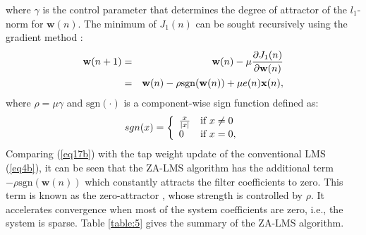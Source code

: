 \noindent where $\gamma$ is the control parameter that determines the degree of attractor of the $l_1$-norm for $\textbf{w}(n)$. The minimum of $J_{1}(n)$ can be sought recursively using the gradient method \cite{Haykins}:
\vspace{-0.6cm}
\begin{eqnarray}
\nonumber
\textbf{w}(n+1)&=&\textbf{w}(n)-\mu\frac{\partial J_1(n)}{\partial\textbf{w}(n)}\\
&=&\textbf{w}(n)-\rho\mathrm{sgn}(\textbf{w}(n))+\mu e(n) \textbf{x}(n),\label{eq17b}\vspace{-0.6cm}
\end{eqnarray}
\noindent where $\rho=\mu\gamma$ and $\mathrm{sgn}(\cdot)$ is a component-wise sign function defined as:
\vspace{-0.6cm}
\begin{equation}
 sgn(x)=\left\{
    \begin{array}{ll}
      \frac{x}{|x|} & \mbox{if $x\neq0$} \\
        0 & \mbox{if $x=0$},    \end{array} \right.\label{eq18b}\vspace{-0.6cm}
\end{equation}
\noindent Comparing (\ref{eq17b}) with the tap weight update of the conventional LMS (\ref{eq4b}), it can be seen that the ZA-LMS algorithm has the additional term $-\rho\mathrm{sgn}(\textbf{w}(n))$ which constantly attracts the filter coefficients to zero. This term is known as the zero-attractor \cite{Hero}, whose strength is controlled by $\rho$. It accelerates convergence when most of the system coefficients are zero, i.e., the system is sparse. Table \ref{table:5} gives the summary of the  ZA-LMS algorithm.

